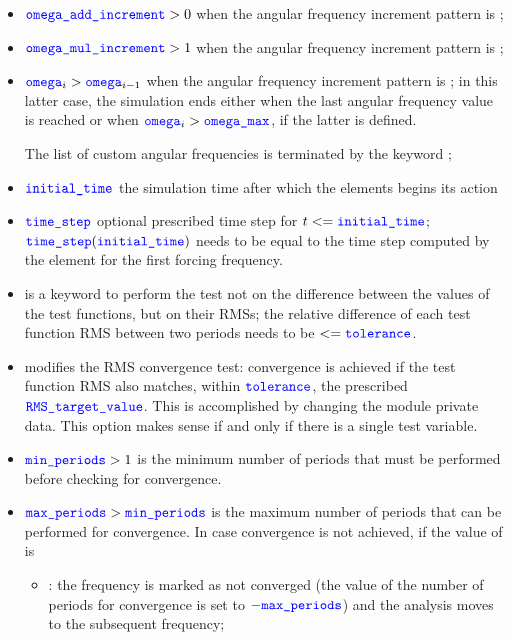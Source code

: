 \begin{itemize}
\item $\textcolor{blue}{\texttt{omega\_add\_increment}} > 0$ when the angular frequency increment pattern is ;

\item $\textcolor{blue}{\texttt{omega\_mul\_increment}} > 1$ when the angular frequency increment pattern is ;

\item $\textcolor{blue}{\texttt{omega}}_i > \textcolor{blue}{\texttt{omega}}_{i-1}$ when the angular frequency increment pattern is ; in this latter case, the simulation ends either when the last angular frequency value is reached or when $\textcolor{blue}{\texttt{omega}}_i > \textcolor{blue}{\texttt{omega\_max}}$, if the latter is defined.

The list of custom angular frequencies is terminated by the keyword ;

\item $\textcolor{blue}{\texttt{initial\_time}}$ the simulation time after which the elements begins its action

\item $\textcolor{blue}{\texttt{time\_step}}$ optional prescribed time step for $t<=\textcolor{blue}{\texttt{initial\_time}}$; $\textcolor{blue}{\texttt{time\_step}}(\textcolor{blue}{\texttt{initial\_time}})$
needs to be equal to the time step computed by the element for the first forcing frequency.

\item {} is a keyword to perform the test not on the difference between the values of the test functions,
but on their RMSs; the relative difference of each test function RMS between two periods needs to be
$<=\textcolor{blue}{\texttt{tolerance}}$.

\item {} modifies the RMS convergence test: convergence is achieved if the test function RMS 
also matches, within $\textcolor{blue}{\texttt{tolerance}}$, the prescribed $\textcolor{blue}{\texttt{RMS\_target\_value}}$. This is
accomplished by changing the module  private data. This option makes sense if and only if
there is a single test variable.

\item $\textcolor{blue}{\texttt{min\_periods}} > 1$ is the minimum number of periods that must be performed before checking for convergence.

\item $\textcolor{blue}{\texttt{max\_periods}} > \textcolor{blue}{\texttt{min\_periods}}$ is the maximum number of periods that can be performed for convergence.
In case convergence is not achieved, if the value of  is
\begin{itemize}
\item {}: the frequency is marked as not converged
(the value of the number of periods for convergence is set to $-\textcolor{blue}{\texttt{max\_periods}}$) and the analysis moves to the subsequent frequency;


\end{itemize}
\end{itemize}
